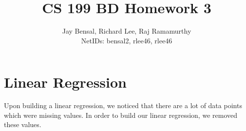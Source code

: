 \documentclass{article}
\begin{document}
\title{CS 199 BD Homework 3}
\author{Jay Bensal, Richard Lee, Raj Ramamurthy\\
  NetIDs: bensal2, rlee46, rlee46}

\maketitle

\section{Linear Regression}
Upon building a linear regression, we noticed that
there are a lot of data points which were missing values. In order to build our
linear regression, we removed these values.
\end{document}
